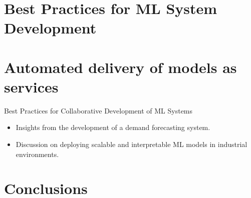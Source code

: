 



\section{Best Practices for ML System Development}
\label{sec:best_practices_ml_system_development}




\section{Automated delivery of models as services}
\label{sec:automated_delivery_models_services}



%


Best Practices for Collaborative Development of ML Systems
\begin{itemize}
    \item Insights from the development of a demand forecasting system.
    \item Discussion on deploying scalable and interpretable ML models in industrial environments.
\end{itemize}




\section{Conclusions}
